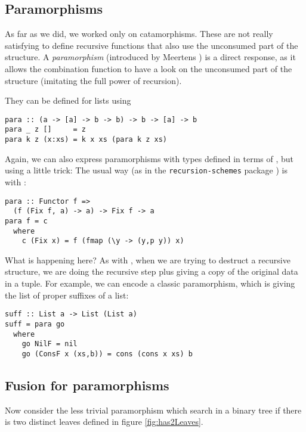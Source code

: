 \subsection{Paramorphisms}
\label{sec:para-list}

As far as we did, we worked only on catamorphisms. These are not really satisfying to define recursive functions that also use the unconsumed part of the structure. A \emph{paramorphism} (introduced by Meertens \cite{Meertens1992}) is a direct response, as it allows the combination function to have a look on the unconsumed part of the structure (imitating the full power of recursion).

They can be defined for lists using 
\begin{verbatim}
para :: (a -> [a] -> b -> b) -> b -> [a] -> b
para _ z []     = z
para k z (x:xs) = k x xs (para k z xs)
\end{verbatim}

Again, we can also express paramorphisms with types defined in terms of , but using a little trick: The usual way (as in the \verb|recursion-schemes| package \cite{ekmett:eschems}) is with :
\begin{verbatim}
para :: Functor f =>
  (f (Fix f, a) -> a) -> Fix f -> a
para f = c
  where
    c (Fix x) = f (fmap (\y -> (y,p y)) x)
\end{verbatim}

\noindent What is happening here? As with , when we are trying to destruct a recursive structure, we are doing the recursive step plus giving a copy of the original data in a tuple.
For example, we can encode a classic paramorphism, which is giving the list of proper suffixes of a list:
\begin{verbatim}
suff :: List a -> List (List a)
suff = para go
  where
    go NilF = nil
    go (ConsF x (xs,b)) = cons (cons x xs) b
\end{verbatim}

\subsection{Fusion for paramorphisms}

Now consider the less trivial paramorphism  which search in a binary tree if there is two distinct leaves defined in figure \ref{fig:has2Leaves}.


